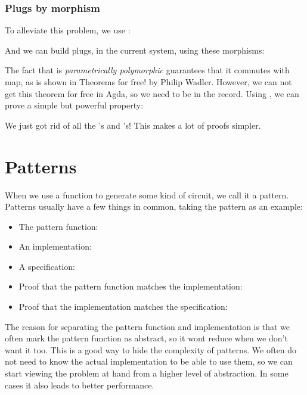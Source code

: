 \subsubsection{Plugs by morphism}\label{plugs-by-morphism}

To alleviate this problem, we use :


And we can build plugs, in the current system, using these morphisms:


The fact that  is \emph{parametrically polymorphic} guarantees
that it commutes with map, as is shown in Theorems for free! by Philip
Wadler.
However, we can not get this theorem for free in Agda, so we need
 to be in the record.
Using , we can prove a simple but powerful
property:


We just got rid of all the 's and 's! This
makes a lot of proofs simpler.

\section{Patterns}\label{patterns}

When we use a function to generate some kind of circuit, we call it a
pattern.
Patterns usually have a few things in common, taking the 
pattern as an example:

\begin{itemize}
\item
  The pattern function: 
\item
  An implementation: 
\item
  A specification: 
\item
  Proof that the pattern function matches the implementation:
\item
  Proof that the implementation matches the specification:
\end{itemize}

The reason for separating the pattern function and implementation is
that we often mark the pattern function as abstract, so it wont reduce
when we don't want it too.
This is a good way to hide the complexity of patterns.
We often do not need to know the actual implementation to be able to
use them, so we can start viewing the problem at hand from a higher
level of abstraction.
In some cases it also leads to better performance.

